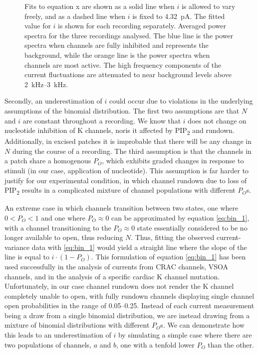 \begin{figure}[h]
{	Fits to equation x are shown as a solid line when $i$ is allowed to vary freely, and as a dashed line when $i$ is fixed to \SI{4.32}{\pico\ampere}.
	The fitted value for $i$ is shown for each recording separately.
	 Averaged power spectra for the three recordings analysed.
	The blue line is the power spectra when channels are fully inhibited and represents the background, while the orange line is the power spectra when channels are most active.
	The high frequency components of the current fluctuations are attenuated to near background levels above \SIrange{2}{3}{\kilo\hertz}.
	}\label{ch4fig:noise_manual}
\end{figure}

Secondly, an underestimation of $i$ could occur due to violations in the underlying assumptions of the binomial distribution.
The first two assumptions are that $N$ and $i$ are constant throughout a recording.
We know that $i$ does not change on nucleotide inhibition of K\ATP{} channels, noris it affected by PIP\textsubscript{2} and rundown.
Additionally, in excised patches it is improbable that there will be any change in $N$ during the course of a recording.
The third assumption is that the channels in a patch share a homogenous $P_O$, which exhibits graded changes in response to stimuli (in our case, application of nucleotide).
This assumption is far harder to justify for our experimental condition, in which channel rundown due to loss of PIP\textsubscript{2} results in a complicated mixture of channel populations with different $P_O$s.

An extreme case in which channels transition between two states, one where $0 < P_O < 1$ and one where $P_O \approx 0$ can be approximated by equation \ref{eq:bin_1}, with a channel transitioning to the $P_O \approx 0$ state essentially considered to be no longer available to open, thus reducing $N$.
Thus, fitting the observed current-variance data with \ref{eq:bin_1} would yield a straight line where the slope of the line is equal to $i \cdot (1 - P_O)$.
This formulation of equation \ref{eq:bin_1} has been used successfully in the analysis of currents from CRAC channels, VSOA channels, and in the analysis of a specific cardiac K\ATP{} channel mutation.
Unfortunately, in our case channel rundown does not render the K\ATP{} channel completely unable to open, with fully rundown channels displaying single channel open probabilities in the range of \numrange{0.05}{0.25}.
Instead of each current measurement being a draw from a single binomial distribution, we are instead drawing from a mixture of binomial distributions with different $P_O$s.
We can demonstrate how this leads to an underestimation of $i$ by simulating a simple case where there are two populations of channels, $a$ and $b$, one with a tenfold lower $P_O$ than the other.

